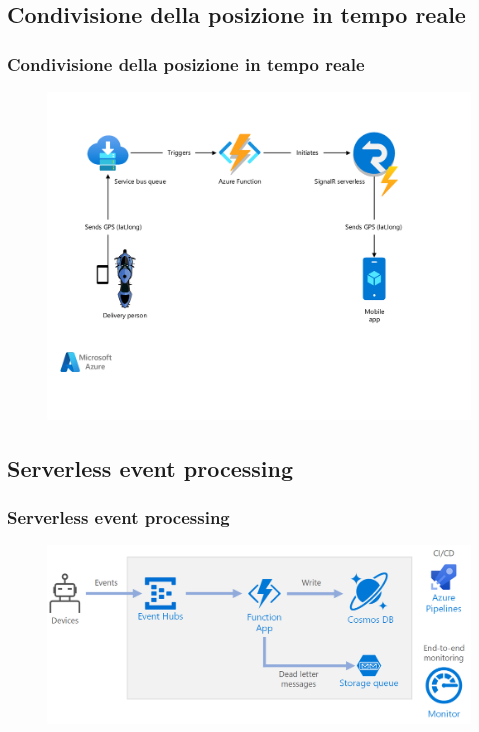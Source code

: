 \documentclass{beamer}
\begin{document}
	\subsection{Condivisione della posizione in tempo reale}
	\begin{frame}
		\frametitle{Condivisione della posizione in tempo reale}
		\begin{figure}
			\includegraphics[width=\textwidth]{img/archdiagram.pdf}
		\end{figure}
	\end{frame}
	
	\subsection{Serverless event processing}
	\begin{frame}
		\frametitle{Serverless event processing}
		\begin{figure}
			\includegraphics[width=\textwidth]{img/serverless-event-processing.png}
		\end{figure}
	\end{frame}
	
\end{document}
